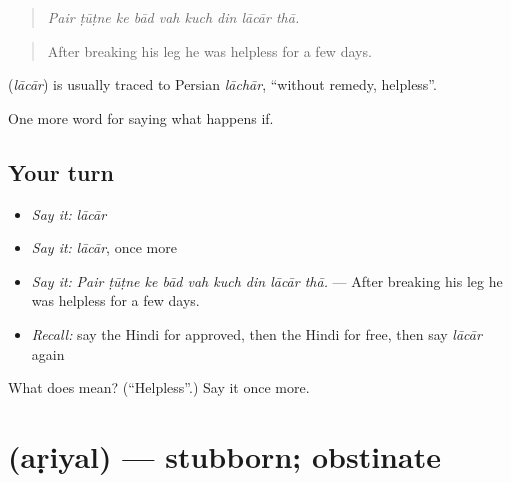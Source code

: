 \begin{quote}
        
\end{quote}

\begin{quote}
\emph{Pair ṭūṭne ke bād vah kuch din lācār thā.}
\end{quote}

\begin{quote}
After breaking his leg he was helpless for a few days.
\end{quote}

\begin{cousinweb}
\textbf{} (\emph{lācār}) is usually traced to Persian \emph{lāchār}, \textquotedblleft{}without remedy, helpless\textquotedblright{}.
\end{cousinweb}

\begin{grammarlens}[title={What you've built}]
One more word for saying what happens if.
\end{grammarlens}

\subsection*{Your turn}
\begin{itemize}
\raggedright
  \item \emph{Say it:} \emph{lācār}
  \item \emph{Say it:} \emph{lācār}, once more
  \item \emph{Say it:} \emph{Pair ṭūṭne ke bād vah kuch din lācār thā.} — After breaking his leg he was helpless for a few days.
  \item \emph{Recall:} say the Hindi for approved, then the Hindi for free, then say \emph{lācār} again
\end{itemize}

\begin{tcolorbox}[breakable,colback=teal!4,colframe=teal!35!black,title={Before you move on}]
What does  mean? (\textquotedblleft{}Helpless\textquotedblright{}.) Say it once more.
\end{tcolorbox}
\section[\texorpdfstring{\hi{अड़ियल} (aṛiyal)}{अड़ियल (aṛiyal)}]{ (aṛiyal) — stubborn; obstinate}

\label{lesson:HI-C551-ariyal}



